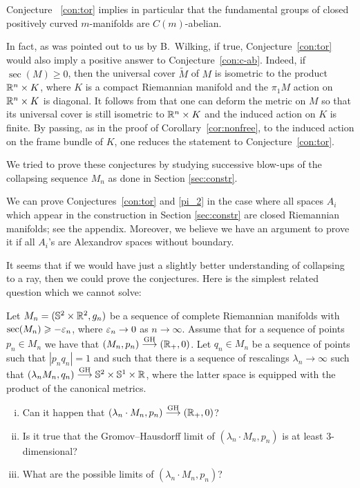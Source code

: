 \documentclass{amsart}
\begin{document}
Conjecture ~\ref{con:tor} implies in particular that the fundamental
groups of closed positively curved $m$-manifolds are $C(m)$-abelian.

In fact, as was pointed out to us by B.~Wilking, if true,
Conjecture~\ref{con:tor} would also imply a positive answer to Conjecture~\ref{con:c-ab}.
Indeed, if $\sec(M)\ge0$, then the universal cover $\tilde M$ of $M$ is isometric to the product ${\Bbb R}^n\times K$, where $K$ is a compact Riemannian manifold and the $\pi_1M$ action  on ${\Bbb R}^n\times K$ is diagonal.
It follows from \cite[Cor. 6.3]{wilking} that one can deform the metric on $M$ so that its universal cover is still isometric to ${\Bbb R}^n\times K$ and the induced action on $K$ is finite.
By passing, as in the proof of Corollary~\ref{cor:nonfree}, to the induced action on the frame bundle of $K$, one reduces the statement to Conjecture~\ref{con:tor}.

We tried to prove these conjectures by studying successive blow-ups of the
collapsing sequence $M_n$ as done in Section \ref{sec:constr}.

We can prove  Conjectures~\ref{con:tor} and \ref{pi_2} in the case where  all spaces $A_i$ which appear in the construction in  Section \ref{sec:constr} are closed Riemannian manifolds; 
see the appendix.
Moreover, we believe we have an argument to prove it if all $A_i$'s are Alexandrov spaces without boundary.

It seems that if we would have just a slightly better understanding of collapsing to a ray, then we could prove the conjectures.
Here is the simplest related question which we cannot solve:

\medskip

\begin{quest}
Let $M_n=({\Bbb S}^2\times{\Bbb R}^2,g_n)$ be a sequence of complete Riemannian manifolds with  $\sec(M_n)\geqslant -\varepsilon_n$, where $\varepsilon_n\to0$ as $n\to\infty$.
Assume that for a sequence of points $p_n\in M_n$ we have that $(M_n,p_n)\GHto ({\Bbb R}_+,0)$.
Let $q_n\in M_n$  be a sequence of points such that $|p_n q_n|=1$ and such that there is a sequence of rescalings $\lambda_n\to\infty$ such that
$(\lambda_n M_n,q_n)\GHto {\Bbb S}^2\times {\Bbb S}^{1}\times {\Bbb R}$, where the latter space is equipped with the product of the canonical metrics.
\begin{enumerate}[(i)]

\item Can it happen that $(\lambda_n\cdot M_n,p_n)\GHto({\Bbb R}_+,0)$?

\item Is it true that  the Gromov--Hausdorff limit of $(\lambda_n \cdot M_n,p_n)$
is at least 3-dimensional?

\item What are the possible limits of $(\lambda_n\cdot  M_n,p_n)$?

\end{enumerate}

\end{quest}
\medskip
\end{document}
